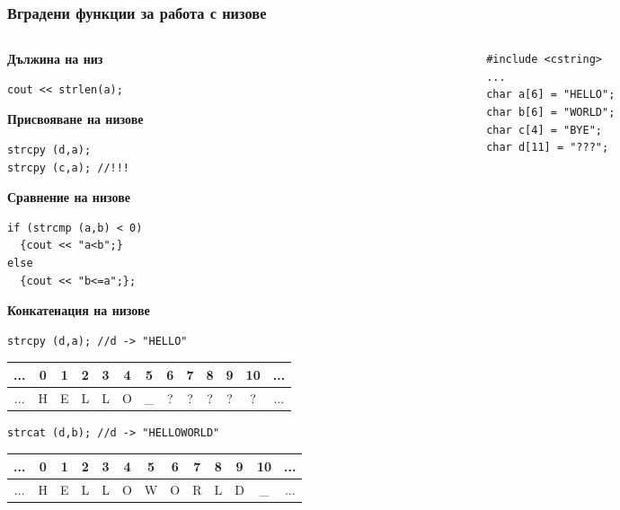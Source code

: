 \documentclass{beamer}
\begin{document}
\begin{frame}[fragile]
\frametitle{Вградени функции за работа с низове}

\begin{columns}[t]

  \begin{column}{0.6\textwidth}
  \textbf{Дължина на низ}
\begin{lstlisting}
cout << strlen(a);
\end{lstlisting}
  \textbf{Присвояване на низове}
\begin{lstlisting}
strcpy (d,a);
strcpy (c,a); //!!!
\end{lstlisting}
  \textbf{Сравнение на низове}
\begin{lstlisting}
if (strcmp (a,b) < 0) 
  {cout << "a<b";} 
else 
  {cout << "b<=a";};
\end{lstlisting}
  \textbf{Конкатенация на низове}
\begin{lstlisting}
strcpy (d,a); //d -> "HELLO"
\end{lstlisting}


\begin{tabular}{c | c | c | c | c | c | c | c | c | c | c | c | c }
\hline
...&0 &1 &2 &3 &4 &5 &6 &7 &8 &9 &10   &... \\\hline
...&H &E &L &L &O &\_ &? &? &? &? &? &... \\\hline
\end{tabular}

\begin{lstlisting}
strcat (d,b); //d -> "HELLOWORLD"
\end{lstlisting}

\begin{tabular}{c | c | c | c | c | c | c | c | c | c | c | c | c }
\hline
...&0 &1 &2 &3 &4 &5 &6 &7 &8 &9 &10   &... \\\hline
...&H &E &L &L &O &W &O &R &L &D &\_ &... \\\hline
\end{tabular}



  \end{column}


  \begin{column}{0.4\textwidth}

\begin{flushleft}
\begin{lstlisting}
#include <cstring>
...
char a[6] = "HELLO";
char b[6] = "WORLD";
char c[4] = "BYE";
char d[11] = "???";
\end{lstlisting}


\end{flushleft}
\end{column}
\end{columns}
\end{frame}
\end{document}
